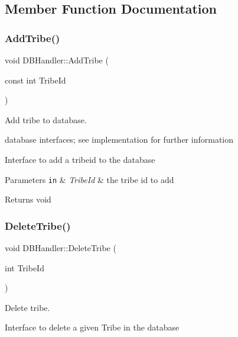 \subsection{Member Function Documentation}
\mbox{\label{class_d_b_handler_a8bf2abc53f0c4d7041fd8dacd3195df6}} 
\subsubsection{\texorpdfstring{Add\+Tribe()}{AddTribe()}}
{\footnotesize\ttfamily void D\+B\+Handler\+::\+Add\+Tribe (\begin{DoxyParamCaption}\item[{const int}]{Tribe\+Id }\end{DoxyParamCaption})}



Add tribe to database. 

database interfaces; see implementation for further information

Interface to add a tribeid to the database


\begin{DoxyParams}[1]{Parameters}
\mbox{\tt in}  & {\em Tribe\+Id} & the tribe id to add \\
\hline
\end{DoxyParams}
\begin{DoxyReturn}{Returns}
void 
\end{DoxyReturn}
\mbox{\label{class_d_b_handler_ad58b74ff1ddb803d2fe7e93744c6eb5f}} 
\subsubsection{\texorpdfstring{Delete\+Tribe()}{DeleteTribe()}}
{\footnotesize\ttfamily void D\+B\+Handler\+::\+Delete\+Tribe (\begin{DoxyParamCaption}\item[{int}]{Tribe\+Id }\end{DoxyParamCaption})}



Delete tribe. 

Interface to delete a given Tribe in the database



